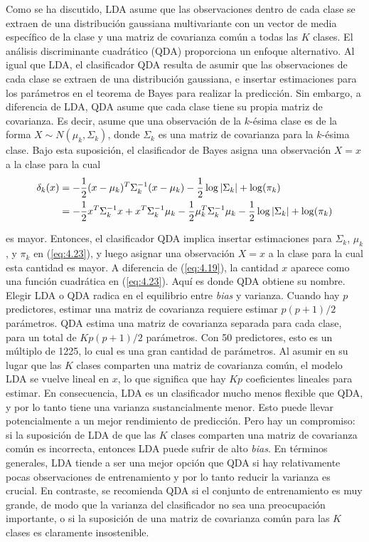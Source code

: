 Como se ha discutido, LDA asume que las observaciones dentro de cada clase se extraen de una distribución gaussiana multivariante con un vector de media específico de la clase y una matriz de covarianza común a todas las $K$ clases. El análisis discriminante cuadrático (QDA) proporciona un enfoque alternativo. Al igual que LDA, el clasificador QDA resulta de asumir que las observaciones de cada clase se extraen de una distribución gaussiana, e insertar estimaciones para los parámetros en el teorema de Bayes para realizar la predicción. Sin embargo, a diferencia de LDA, QDA asume que cada clase tiene su propia matriz de covarianza. Es decir, asume que una observación de la $k$-ésima clase es de la forma $X \sim N(\mu_k, \Sigma_k)$, donde $\Sigma_k$ es una matriz de covarianza para la $k$-ésima clase. Bajo esta suposición, el clasificador de Bayes asigna una observación $X = x$ a la clase para la cual
\begin{align}
\delta_k(x) &= - \frac{1}{2} (x - \mu_k)^T \Sigma_k^{-1} (x - \mu_k) -\frac{1}{2} \log|\Sigma_k| + \log(\pi_k) \notag \\
&= - \frac{1}{2} x^T \Sigma_k^{-1} x + x^T \Sigma_k^{-1} \mu_k - \frac{1}{2} \mu_k^T \Sigma_k^{-1} \mu_k - \frac{1}{2} \log|\Sigma_k| + \log(\pi_k)
\label{eq:4.23}
\end{align}

es mayor. Entonces, el clasificador QDA implica insertar estimaciones para $\Sigma_k$, $\mu_k$, y $\pi_k$ en (\ref{eq:4.23}), y luego asignar una observación $X = x$ a la clase para la cual esta cantidad es mayor. A diferencia de (\ref{eq:4.19}), la cantidad $x$ aparece como una función cuadrática en (\ref{eq:4.23}). Aquí es donde QDA obtiene su nombre. \\

Elegir LDA o QDA radica en el equilibrio entre \textit{bias} y varianza. Cuando hay $p$ predictores, estimar una matriz de covarianza requiere estimar $p(p+1)/2$ parámetros. QDA estima una matriz de covarianza separada para cada clase, para un total de $Kp(p+1)/2$ parámetros. Con 50 predictores, esto es un múltiplo de 1225, lo cual es una gran cantidad de parámetros. Al asumir en su lugar que las $K$ clases comparten una matriz de covarianza común, el modelo LDA se vuelve lineal en $x$, lo que significa que hay $Kp$ coeficientes lineales para estimar. En consecuencia, LDA es un clasificador mucho menos flexible que QDA, y por lo tanto tiene una varianza sustancialmente menor. Esto puede llevar potencialmente a un mejor rendimiento de predicción. Pero hay un compromiso: si la suposición de LDA de que las $K$ clases comparten una matriz de covarianza común es incorrecta, entonces LDA puede sufrir de alto \textit{bias}. En términos generales, LDA tiende a ser una mejor opción que QDA si hay relativamente pocas observaciones de entrenamiento y por lo tanto reducir la varianza es crucial. En contraste, se recomienda QDA si el conjunto de entrenamiento es muy grande, de modo que la varianza del clasificador no sea una preocupación importante, o si la suposición de una matriz de covarianza común para las $K$ clases es claramente insostenible. \\

